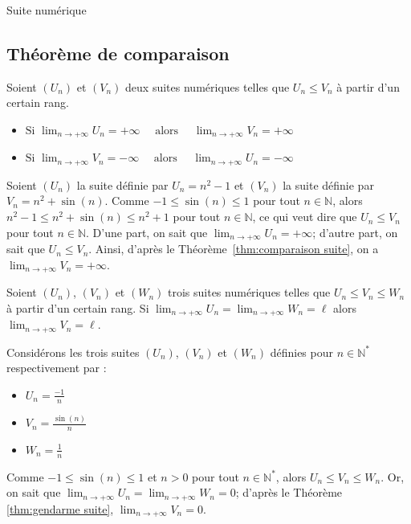 \begin{chapter}{Suite num\'erique}
\subsection{Th\'eor\`eme de comparaison}
%
\begin{thm}
\label{thm:comparaison suite}
Soient $(U_n)$ et $(V_n)$ deux suites num\'eriques telles que $U_n \leq V_n$ \`a partir d'un certain rang.
\begin{itemize} 
\item
      $
      \text{Si }
      \lim_{n \rightarrow + \infty} U_n = + \infty
      \quad
      \text{ alors }
      \quad
      \lim_{n \rightarrow + \infty} V_n = + \infty
      $
\item
      $
      \text{Si }
      \lim_{n \rightarrow + \infty} V_n = - \infty
      \quad
      \text{ alors }
      \quad
      \lim_{n \rightarrow + \infty} U_n = - \infty
      $
\end{itemize}
\end{thm}
\begin{ex}
Soient $(U_n)$ la suite d\'efinie par $U_n = n^2 - 1 $ et $(V_n)$ la suite d\'efinie par ${V_n = n^2 + \sin (n)}$.
Comme $-1 \leq \sin (n) \leq 1$ pour tout $n \in \mathbb{N}$, alors 
      $n^2 - 1 \leq n^2 + \sin (n) \leq n^2 + 1$ pour tout $n \in \mathbb{N}$, ce qui veut dire que 
      $U_n \leq V_n$ pour tout $n \in \mathbb{N}$.
D'une part, on sait que $\lim_{n \rightarrow + \infty} U_n = + \infty$; d'autre part, on sait que $U_n \leq V_n$.
Ainsi, d'apr\`es le Th\'eor\`eme~\ref{thm:comparaison suite}, on a $\lim_{n \rightarrow + \infty} V_n = + \infty$.
\end{ex}
%
\begin{thm}
\label{thm:gendarme suite}
Soient $(U_n)$, $(V_n)$ et $(W_n)$ trois suites num\'eriques telles que ${U_n \leq V_n \leq W_n}$ \`a partir d'un certain rang.
Si $\lim_{n \rightarrow + \infty} U_n = \lim_{n \rightarrow + \infty} W_n = \ell$ alors $\lim_{n \rightarrow + \infty} V_n = \ell$.
\end{thm}
\begin{ex}
Consid\'erons les trois suites $(U_n)$, $(V_n)$ et $(W_n)$ d\'efinies pour $n \in \mathbb{N}^*$ respectivement par : 
\begin{itemize} 
\item $ U_n = \frac{-1}{n} $
\item $ V_n = \frac{\sin(n)}{n} $
\item $ W_n = \frac{1}{n} $
\end{itemize}
Comme $-1 \leq \sin (n) \leq 1$ et $n > 0$ pour tout $n \in \mathbb{N}^*$, alors 
      $U_n \leq V_n \leq W_n$.
Or, on sait que $ \lim_{n \rightarrow + \infty} U_n = \lim_{n \rightarrow + \infty} W_n = 0$; d'apr\`es le Th\'eor\`eme \ref{thm:gendarme suite}, $ \lim_{n \rightarrow + \infty} V_n = 0 $.
\end{ex}
%

\end{chapter}
